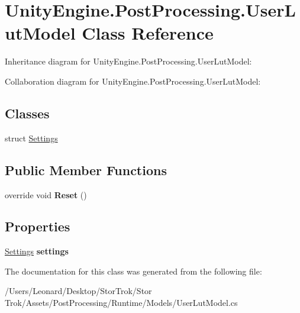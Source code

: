 \hypertarget{class_unity_engine_1_1_post_processing_1_1_user_lut_model}{}\section{Unity\+Engine.\+Post\+Processing.\+User\+Lut\+Model Class Reference}
\label{class_unity_engine_1_1_post_processing_1_1_user_lut_model}


Inheritance diagram for Unity\+Engine.\+Post\+Processing.\+User\+Lut\+Model\+:


Collaboration diagram for Unity\+Engine.\+Post\+Processing.\+User\+Lut\+Model\+:
\subsection*{Classes}
\begin{DoxyCompactItemize}
\item 
struct \hyperlink{struct_unity_engine_1_1_post_processing_1_1_user_lut_model_1_1_settings}{Settings}
\end{DoxyCompactItemize}
\subsection*{Public Member Functions}
\begin{DoxyCompactItemize}
\item 
\mbox{\label{class_unity_engine_1_1_post_processing_1_1_user_lut_model_af9a480ba07bbcd8c4863610c30e2e1f7}} 
override void {\bfseries Reset} ()
\end{DoxyCompactItemize}
\subsection*{Properties}
\begin{DoxyCompactItemize}
\item 
\mbox{\label{class_unity_engine_1_1_post_processing_1_1_user_lut_model_a0fb6df59627b12d97cf28efb64ae8033}} 
\hyperlink{struct_unity_engine_1_1_post_processing_1_1_user_lut_model_1_1_settings}{Settings} {\bfseries settings}
\end{DoxyCompactItemize}


The documentation for this class was generated from the following file\+:\begin{DoxyCompactItemize}
\item 
/\+Users/\+Leonard/\+Desktop/\+Stor\+Trok/\+Stor Trok/\+Assets/\+Post\+Processing/\+Runtime/\+Models/User\+Lut\+Model.\+cs\end{DoxyCompactItemize}
